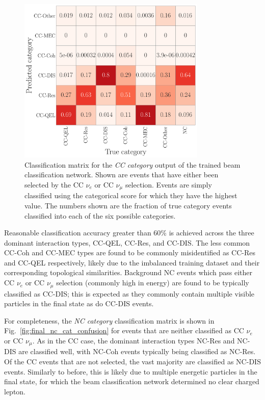 \begin{figure} %
    \includegraphics[width=0.8\textwidth]{diagrams/7-results/final_cc_cat_confusion.pdf}
    \caption[Classification matrix for the CC category output of the beam classification network]
    {Classification matrix for the \emph{CC category} output of the trained beam classification
        network. Shown are events that have either been selected by the CC $\nu_{e}$ or CC
        $\nu_{\mu}$ selection. Events are simply classified using the categorical score for which
        they have the highest value. The numbers shown are the fraction of true category events
        classified into each of the six possible categories.}
    \label{fig:final_cc_cat_confusion}
\end{figure}

Reasonable classification accuracy greater than 60\% is achieved across the three dominant
interaction types, CC-QEL, CC-Res, and CC-DIS. The less common CC-Coh and CC-MEC types are found
to be commonly misidentified as CC-Res and CC-QEL respectively, likely due to the imbalanced
training dataset and their corresponding topological similarities. Background NC events which pass
either CC $\nu_{e}$ or CC $\nu_{\mu}$ selection (commonly high in energy) are found to be
typically classified as CC-DIS; this is expected as they commonly contain multiple visible
particles in the final state as do CC-DIS events.

For completeness, the \emph{NC category} classification matrix is shown in
Fig.~\ref{fig:final_nc_cat_confusion} for events that are neither classified as CC $\nu_{e}$ or CC
$\nu_{\mu}$. As in the CC case, the dominant interaction types NC-Res and NC-DIS are classified
well, with NC-Coh events typically being classified as NC-Res. Of the CC events that are not
selected, the vast majority are classified as NC-DIS events. Similarly to before, this is likely
due to multiple energetic particles in the final state, for which the beam classification network
determined no clear charged lepton.

